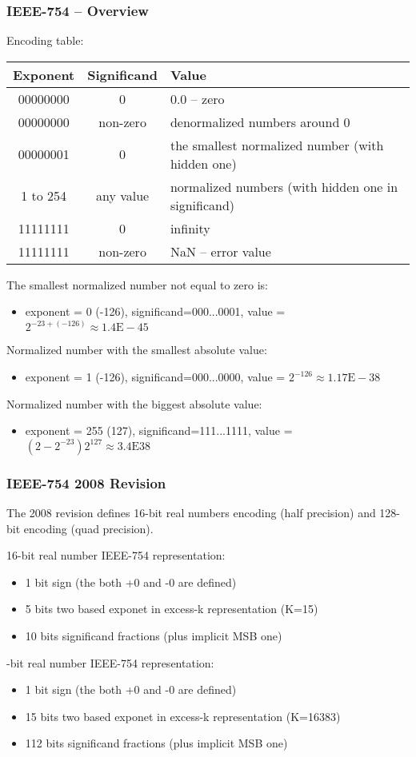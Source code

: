 \documentclass{beamer}
\begin{document}
\begin{frame}[shrink=5]
\frametitle{IEEE-754 -- Overview}

Encoding table:
\begin{tabular}{|c|c|l|}\hline
Exponent & Significand &  Value \\ \hline
00000000 & 0 &  0.0 -- zero \\ \hline
00000000 & non-zero &  denormalized numbers around 0 \\ \hline
00000001 & 0 & the smallest normalized number (with hidden one) \\ \hline
\small 1 to 254 & any value &  normalized numbers (with hidden one in significand)  \\ \hline
11111111 & 0 &  infinity \\ \hline
11111111 & non-zero &  NaN -- error value \\ \hline
\end{tabular}
\bigskip

The smallest normalized number not equal to zero is:
\begin{itemize}
\item \small exponent = 0 (-126), significand=000...0001, value = $2^{-23+(-126)} \approx 1.4\text{E}-45$
\end{itemize}
Normalized number with the smallest absolute value:
\begin{itemize}
\item \small exponent = 1 (-126), significand=000...0000, value = $2^{-126} \approx 1.17\text{E}-38$
\end{itemize}
Normalized number with the biggest absolute value:
\begin{itemize}
\item \small exponent = 255 (127), significand=111...1111, value = $(2-2^{-23})2^{127} \approx 3.4\text{E}38$
\end{itemize}
\end{frame}


\begin{frame}
\frametitle{IEEE-754 2008 Revision }

The 2008 revision defines 16-bit real numbers encoding (half precision) and 128-bit encoding (quad precision).

16-bit real number IEEE-754 representation:
\begin{itemize}
\item 1 bit sign (the both +0 and -0 are defined)
\item 5 bits two based exponet in excess-k representation (K=15)
\item 10 bits significand fractions (plus implicit MSB one)
\end{itemize}
-bit real number IEEE-754 representation:
\begin{itemize}
\item 1 bit sign (the both +0 and -0 are defined)
\item 15 bits two based exponet in excess-k representation (K=16383)
\item 112 bits significand fractions (plus implicit MSB one)
\end{itemize}

\end{frame}
\end{document}
